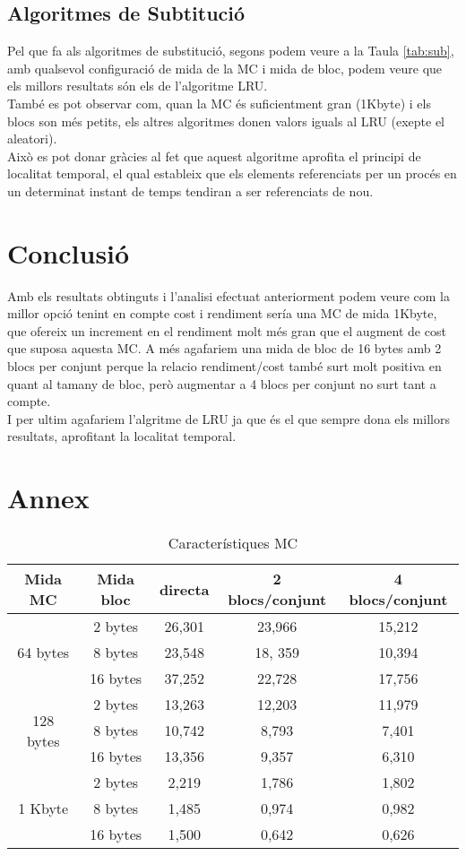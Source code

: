 \documentclass{article}
\begin{document}
\subsection{Algoritmes de Subtitució}
Pel que fa als algoritmes de substitució, segons podem veure a la Taula \ref{tab:sub}, amb qualsevol
 configuració de mida de la MC i mida de bloc, podem veure que els millors resultats són els de l'algoritme LRU.\\
També es pot observar com, quan la MC és suficientment gran (1Kbyte) i els blocs son més petits, els altres 
algoritmes donen valors iguals al LRU (exepte el aleatori).\\
 Això es pot donar gràcies al fet que aquest algoritme aprofita el principi de localitat temporal, el qual estableix 
que els elements referenciats per un procés en un determinat instant de temps tendiran a ser referenciats de nou.\\
\section{Conclusió}
Amb els resultats obtinguts i l'analisi efectuat anteriorment podem veure com la millor opció tenint en compte 
cost i rendiment sería una MC de mida 1Kbyte, que ofereix un increment en el rendiment molt més gran que el 
augment de cost que suposa aquesta MC. A més agafariem una mida de bloc de 16 bytes amb 2 blocs per conjunt perque la relacio rendiment/cost 
també surt molt positiva en quant al tamany de bloc, però augmentar a 4 blocs per conjunt no surt tant a compte.\\
I per ultim agafariem l'algritme de LRU ja que és el que sempre dona els millors resultats, aprofitant la localitat temporal.
\newpage
\section{Annex}
\begin{table}[!h]
\centering
\begin{tabular}{ |c|c|c|c|c| }
\hline
Mida MC& Mida bloc& directa& 2 blocs/conjunt& 4 blocs/conjunt \\
\hline
\multirow{3}{4em}{64 bytes} & 2 bytes & 26,301 & 23,966 & 15,212 \\
& 8 bytes & 23,548 & 18, 359 & 10,394 \\
& 16 bytes & 37,252 & 22,728 & 17,756 \\
\hline
\multirow{3}{4em}{128 bytes} & 2 bytes & 13,263 & 12,203 & 11,979 \\
& 8 bytes & 10,742 & 8,793 & 7,401 \\
& 16 bytes & 13,356 & 9,357 & 6,310 \\
\hline
\multirow{3}{4em}{1 Kbyte} & 2 bytes & 2,219 & 1,786 & 1,802 \\
& 8 bytes & 1,485 & 0,974 & 0,982 \\
& 16 bytes & 1,500 & 0,642 & 0,626 \\
\hline
\end{tabular}
\caption{Característiques MC}
\label{tab:mc}
\end{table}
\end{document}
